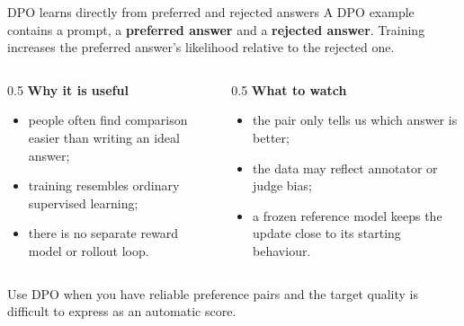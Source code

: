 \documentclass[aspectratio=169,10pt]{beamer}
\begin{document}
\begin{frame}{DPO learns directly from preferred and rejected answers}
  A DPO example contains a prompt, a \textbf{preferred answer} and a
  \textbf{rejected answer}. Training increases the preferred answer's
  likelihood relative to the rejected one.
  \vspace{0.5em}

  \begin{columns}[T]
    \begin{column}{0.5\textwidth}
      \textbf{Why it is useful}
      \begin{itemize}
        \item people often find comparison easier than writing an ideal answer;
        \item training resembles ordinary supervised learning;
        \item there is no separate reward model or rollout loop.
      \end{itemize}
    \end{column}
    \begin{column}{0.5\textwidth}
      \textbf{What to watch}
      \begin{itemize}
        \item the pair only tells us which answer is better;
        \item the data may reflect annotator or judge bias;
        \item a frozen reference model keeps the update close to its starting
          behaviour.
      \end{itemize}
    \end{column}
  \end{columns}

  \begin{takeaway}
    Use DPO when you have reliable preference pairs and the target quality is
    difficult to express as an automatic score.
  \end{takeaway}
\end{frame}
\end{document}

